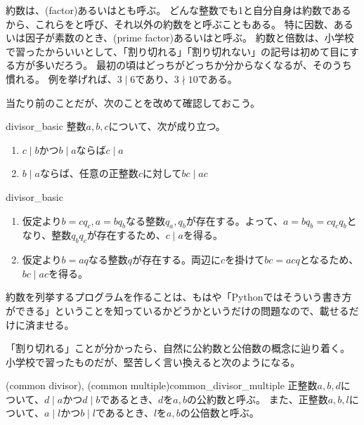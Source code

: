 約数は、(factor)あるいはとも呼ぶ。
どんな整数でも1と自分自身は約数であるから、これらをと呼び、それ以外の約数をと呼ぶこともある。
特に因数、あるいは因子が素数のとき、(prime factor)あるいはと呼ぶ。
約数と倍数は、小学校で習ったからいいとして、「割り切れる」「割り切れない」の記号は初めて目にする方が多いだろう。
最初の頃はどっちがどっちか分からなくなるが、そのうち慣れる。
例を挙げれば、$3 \mid 6$であり、$3 \nmid 10$である。

当たり前のことだが、次のことを改めて確認しておこう。

\begin{Prop}{}{divisor_basic}
整数$a,b,c$について、次が成り立つ。
\begin{enumerate}
 \item $c \mid b$かつ$b \mid a$ならば$c \mid a$
 \item $b \mid a$ならば、任意の正整数$c$に対して$bc \mid ac$
\end{enumerate}
\end{Prop}

\begin{prProof}{divisor_basic}\;
\begin{enumerate}
 \item 仮定より$b=cq_c, a=bq_b$なる整数$q_a,q_b$が存在する。よって、$a=bq_b=cq_cq_b$となり、整数$q_bq_c$が存在するため、$c \mid a$を得る。
 \item 仮定より$b=aq$なる整数$q$が存在する。両辺に$c$を掛けて$bc=acq$となるため、$bc \mid ac$を得る。
\end{enumerate}
\end{prProof}

約数を列挙するプログラムを作ることは、もはや「Pythonではそういう書き方ができる」ということを知っているかどうかというだけの問題なので、載せるだけに済ませる。


「割り切れる」ことが分かったら、自然に公約数と公倍数の概念に辿り着く。
小学校で習ったものだが、堅苦しく言い換えると次のようになる。

\begin{Defi}{(common divisor), (common multiple)}{common_divisor_multiple}
正整数$a, b, d$について、$d \mid a$かつ$ d \mid b$であるとき、$d$を$a,b$の公約数と呼ぶ。
また、正整数$a, b, l$について、$a \mid l$かつ$b \mid l$であるとき、$l$を$a,b$の公倍数と呼ぶ。
\end{Defi}

